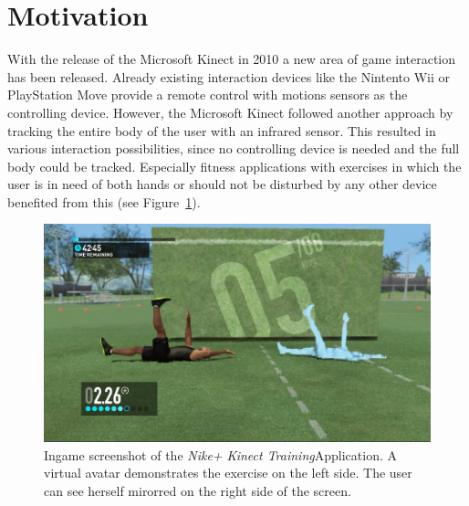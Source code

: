 \section{Motivation}\label{1_1_motivation}
With the release of the Microsoft Kinect in 2010 a new area of game interaction has been released.
Already existing interaction devices like the Nintento Wii or PlayStation Move provide a remote control with motions sensors as the controlling device.
However, the Microsoft Kinect followed another approach by tracking the entire body of the user with an infrared sensor.
This resulted in various interaction possibilities, since no controlling device is needed and the full body could be tracked.
Especially fitness applications with exercises in which the user is in need of both hands or should not be disturbed by any other device benefited from this (see Figure~\ref{fig:1_kinectSports}).
\begin{figure}[htb]
	\centering
	\begin{minipage}[t]{1\linewidth}
		\centering
		\includegraphics[width=0.55\linewidth]{Pictures/1_nikePlusKinect2}
		\caption{Ingame screenshot of the \textit{Nike+ Kinect Training}\protect\footnotemark Application. A virtual avatar demonstrates the exercise on the left side. The user can see herself mirorred on the right side of the screen.}
		\label{fig:1_kinectSports}
	\end{minipage}
\end{figure}


